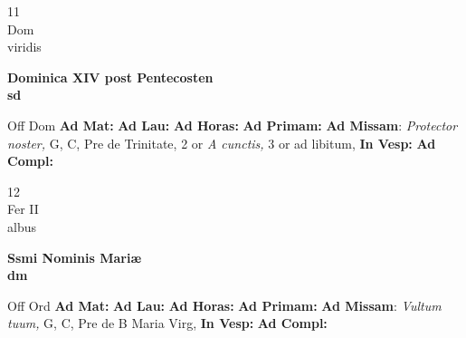 \documentclass[10pt, openany]{book}
\begin{document}
    \begin{center}
        \begin{minipage}{3.5in}
            \vspace{2em}
            \begin{minipage}{0.5in}
                {\Huge 11} \\
                {\normalsize Dom} \\
                {\normalsize viridis}
            \end{minipage}
            \begin{minipage}{3.0in}
                \textbf{ \large Dominica XIV post Pentecosten \\
                \textnormal{\normalsize sd}} \\ 
            \end{minipage}
            \begin{justify}Off Dom
                \textbf{Ad Mat: }
                \textbf{Ad Lau: }
                \textbf{Ad Horas: }
                \textbf{Ad Primam: }\textbf{Ad Missam}: \textit{Protector noster,} G, C, Pre de Trinitate, 2 or \textit{A cunctis,} 3 or ad libitum,  
                \textbf{In Vesp: }
                \textbf{Ad Compl: }
            \end{justify}
        \end{minipage}
    \end{center}

    \begin{center}
        \begin{minipage}{3.5in}
            \vspace{2em}
            \begin{minipage}{0.5in}
                {\Huge 12} \\
                {\normalsize Fer II} \\
                {\normalsize albus}
            \end{minipage}
            \begin{minipage}{3.0in}
                \textbf{ \large Ssmi Nominis Mariæ \\
                \textnormal{\normalsize dm}} \\ 
            \end{minipage}
            \begin{justify}Off Ord
                \textbf{Ad Mat: }
                \textbf{Ad Lau: }
                \textbf{Ad Horas: }
                \textbf{Ad Primam: }\textbf{Ad Missam}: \textit{Vultum tuum,} G, C, Pre de B Maria Virg,  
                \textbf{In Vesp: }
                \textbf{Ad Compl: }
            \end{justify}
        \end{minipage}
    \end{center}
\end{document}
